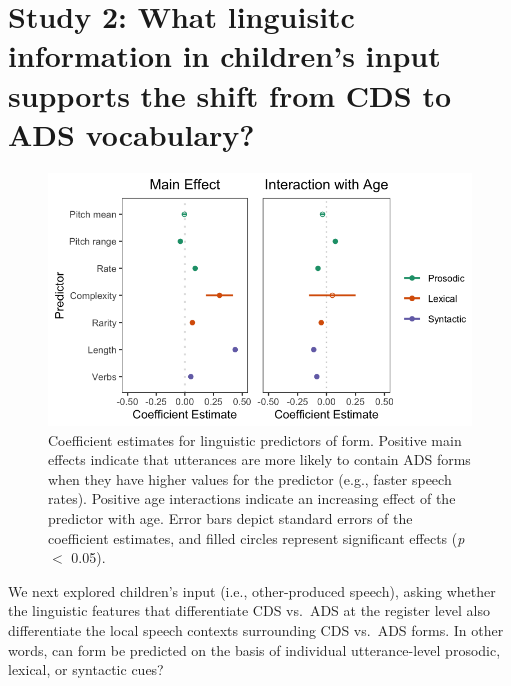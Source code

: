 \documentclass[10pt, letterpaper]{article}
\newenvironment{CodeChunk}{}{}
\begin{document}
\hypertarget{study-2-what-linguisitc-information-in-childrens-input-supports-the-shift-from-cds-to-ads-vocabulary}{%
\section{Study 2: What linguisitc information in children's input
supports the shift from CDS to ADS
vocabulary?}\label{study-2-what-linguisitc-information-in-childrens-input-supports-the-shift-from-cds-to-ads-vocabulary}}

\begin{CodeChunk}
\begin{figure}[h]

{\centering \includegraphics{figs/model-plot-1} 

}

\caption[Coefficient estimates for linguistic predictors of form]{Coefficient estimates for linguistic predictors of form. Positive main effects indicate that utterances are more likely to contain ADS forms when they have higher values for the predictor (e.g., faster speech rates). Positive age interactions indicate an increasing effect of the predictor with age. Error bars depict standard errors of the coefficient estimates, and filled circles represent significant effects (\textit{p} $<$ 0.05).}\label{fig:model-plot}
\end{figure}
\end{CodeChunk}

We next explored children's input (i.e., other-produced speech), asking
whether the linguistic features that differentiate CDS vs.~ADS at the
register level also differentiate the local speech contexts surrounding
CDS vs.~ADS forms. In other words, can form be predicted on the basis of
individual utterance-level prosodic, lexical, or syntactic cues?
\end{document}
